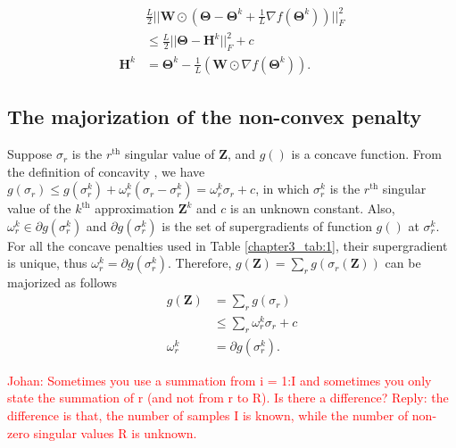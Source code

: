 \begin{equation}\label{chapter3_eq:4}
\begin{aligned}
              &\frac{L}{2} ||\mathbf{W} \odot(\mathbf{\Theta} - \mathbf{\Theta}^k + \frac{1}{L} \nabla f(\mathbf{\Theta}^k))||_F^2 \\
             &\leq  \frac{L}{2} ||\mathbf{\Theta}-\mathbf{H}^k||_F^2 + c \\
              \mathbf{H}^k &= \mathbf{\Theta}^k - \frac{1}{L} (\mathbf{W}\odot \nabla f(\mathbf{\Theta}^k)).
\end{aligned}
\end{equation}

\subsection{The majorization of the non-convex penalty}
Suppose $\sigma_r$ is the $r^{\text{th}}$ singular value of $\mathbf{Z}$, and $g()$ is a concave function. From the definition of concavity \cite{boyd2004convex}, we have $g(\sigma_r) \leq g(\sigma_r^k) + \omega_r^k(\sigma_r - \sigma_r^k) = \omega_r^k \sigma_r + c$, in which $\sigma_r^k$ is the $r^{\text{th}}$ singular value of the $k^{\text{th}}$ approximation $\mathbf{Z}^k$ and $c$ is an unknown constant. Also, $\omega_r^k \in \partial g(\sigma_r^k)$ and $\partial g(\sigma_r^k)$ is the set of supergradients of function $g()$ at $\sigma_r^k$. For all the concave penalties used in Table \ref{chapter3_tab:1}, their supergradient is unique, thus $\omega_r^k = \partial g(\sigma_r^k)$. Therefore, $g(\mathbf{Z})= \sum_{r}g(\sigma_r(\mathbf{Z}))$ can be majorized as follows
\begin{equation}\label{chapter3_eq:5}
\begin{aligned}
g(\mathbf{Z}) &= \sum_{r}g(\sigma_r)\\
              &\leq \sum_{r}\omega_{r}^k \sigma_r + c\\
       \omega_r^k &= \partial g(\sigma_r^k).
\end{aligned}
\end{equation}

\textcolor{red}{Johan: Sometimes you use a summation from i = 1:I and sometimes you only state the summation of r (and not from r to R). Is there a difference? Reply: the difference is that, the number of samples I is known, while the number of non-zero singular values R is unknown.}

